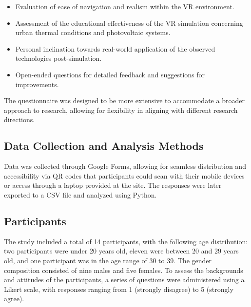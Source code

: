 \documentclass[draft, final]{vutinfth} %
\begin{document}
\begin{itemize}
    \item Evaluation of ease of navigation and realism within the VR environment.
    \item Assessment of the educational effectiveness of the VR simulation concerning urban thermal conditions and photovoltaic systems.
    \item Personal inclination towards real-world application of the observed technologies post-simulation.
    \item Open-ended questions for detailed feedback and suggestions for improvements.
\end{itemize}

The questionnaire was designed to be more extensive to accommodate a broader approach to research, allowing for flexibility in aligning with different research directions.

\subsection{Data Collection and Analysis Methods}

Data was collected through Google Forms, allowing for seamless distribution and accessibility via QR codes that participants could scan with their mobile devices or access through a laptop provided at the site. The responses were later exported to a CSV file and analyzed using Python.

\subsection{Participants}

The study included a total of 14 participants, with the following age distribution: two participants were under 20 years old, eleven were between 20 and 29 years old, and one participant was in the age range of 30 to 39. The gender composition consisted of nine males and five females. To assess the backgrounds and attitudes of the participants, a series of questions were administered using a Likert scale, with responses ranging from 1 (strongly disagree) to 5 (strongly agree).
\end{document}
